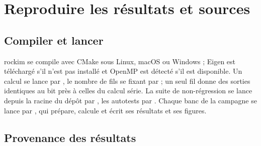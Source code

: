 \section{Reproduire les résultats et sources}
\label{sec-annexe-reproduire}

\subsection{Compiler et lancer}

rockim se compile avec CMake sous Linux, macOS ou Windows ; Eigen est téléchargé s'il n'est pas installé et OpenMP est détecté s'il est disponible. Un calcul se lance par , le nombre de fils se fixant par  ; un seul fil donne des sorties identiques au bit près à celles du calcul série. La suite de non-régression se lance depuis la racine du dépôt par , les autotests par . Chaque banc de la campagne se lance par , qui prépare, calcule et écrit ses résultats et ses figures.

\subsection{Provenance des résultats}

